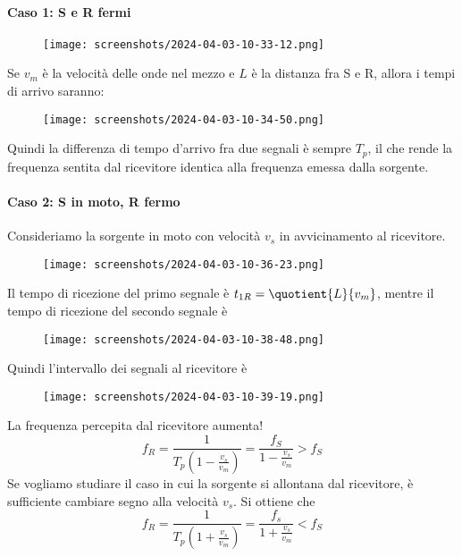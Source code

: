 \paragraph{Caso 1: S e R fermi}
\begin{figure}[H]
	\centering
	\texttt{[image: screenshots/2024-04-03-10-33-12.png]}
\end{figure}
Se \(v_m\) è la velocità delle onde nel mezzo e \(L\) è la distanza fra S e R, allora i tempi di arrivo saranno:
\begin{figure}[H]
	\centering
	\texttt{[image: screenshots/2024-04-03-10-34-50.png]}
\end{figure}
Quindi la differenza di tempo d'arrivo fra due segnali è sempre \(T_p\), il che rende la frequenza sentita dal ricevitore identica alla frequenza emessa dalla sorgente.

\paragraph{Caso 2: S in moto, R fermo} Consideriamo la sorgente in moto con velocità \(v_s\) in avvicinamento al ricevitore.
\begin{figure}[H]
	\centering
	\texttt{[image: screenshots/2024-04-03-10-36-23.png]}
\end{figure}
Il tempo di ricezione del primo segnale è \(t_{1R} = \quotient{L}{v_m} \), mentre il tempo di ricezione del secondo segnale è
\begin{figure}[H]
	\centering
	\texttt{[image: screenshots/2024-04-03-10-38-48.png]}
\end{figure}
Quindi l'intervallo dei segnali al ricevitore è
\begin{figure}[H]
	\centering
	\texttt{[image: screenshots/2024-04-03-10-39-19.png]}
\end{figure}
La frequenza percepita dal ricevitore aumenta!
\[
	f_R = \frac{1}{T_p \left( 1- \frac{v_s}{v_m} \right) } = \frac{f_S}{1- \frac{v_s}{v_m}} > f_S
\]
Se vogliamo studiare il caso in cui la sorgente si allontana dal ricevitore, è sufficiente cambiare segno alla velocità \(v_s\). Si ottiene che
\[
	f_R = \frac{1}{T_p \left( 1+ \frac{v_s}{v_m} \right)}  = \frac{f_s}{1 + \frac{v_s}{v_m}} < f_S
\]

